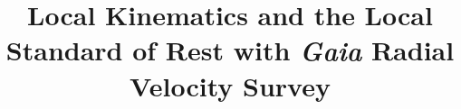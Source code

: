 \documentclass{aastex62}
\begin{document}
	
	\title{Local Kinematics and the Local Standard of Rest with \textit{Gaia} Radial Velocity Survey}
	
	
	
\end{document}
